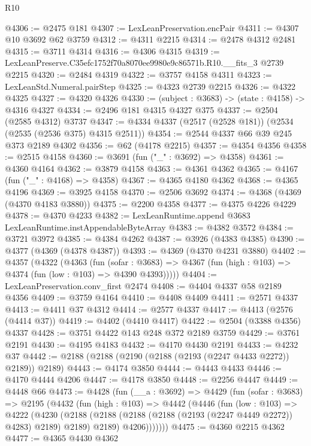\begin{lexlean}{R10}
\begin{coremodule}
@4306 := @2475 @181
@4307 := LexLeanPreservation.encPair
@4311 := @4307 @10 @3692 @62 @3759
@4312 := @4311 @2215
@4314 := @2478 @4312 @2481
@4315 := @3711 @4314
@4316 := @4306 @4315
@4319 := LexLeanPreserve.C35efc1752f70a8070ee9980e9c86571b.R10.__fits_3 @2739 @2215
@4320 := @2484 @4319
@4322 := @3757 @4158 @4311
@4323 := LexLeanStd.Numeral.pairStep
@4325 := @4323 @2739 @2215
@4326 := @4322 @4325
@4327 := @4320 @4326
@4330 := (subject : @3683) -> (state : @4158) -> @4316 @4327
@4334 := @2496 @181 @4315 @4327 @375
@4337 := @2504 (@2585 @4312) @3737
@4347 := @4334 @4337 (@2517 (@2528 @181)) (@2534 (@2535 (@2536 @375) @4315 @2511))
@4354 := @2544 @4337 @66 @39 @245 @373 @2189 @4302
@4356 := @62 (@4178 @2215)
@4357 := @4354 @4356
@4358 := @2515 @4158
@4360 := @3691 (fun ("_" : @3692) => @4358)
@4361 := @4360 @4164
@4362 := @3879 @4158
@4363 := @4361 @4362
@4365 := @4167 (fun ("_" : @4168) => @4358)
@4367 := @4365 @4180 @4362
@4368 := @4365 @4196
@4369 := @3925 @4158
@4370 := @2506 @3692
@4374 := @4368 (@4369 (@4370 @4183 @3880))
@4375 := @2200 @4358
@4377 := @4375 @4226 @4229
@4378 := @4370 @4233
@4382 := LexLeanRuntime.append @3683 LexLeanRuntime.instAppendableByteArray
@4383 := @4382 @3572
@4384 := @3721 @3972
@4385 := @4384 @4262
@4387 := @3926 (@4383 @4385)
@4390 := @4377 (@4369 (@4378 @4387))
@4393 := @4369 (@4370 @4231 @3880)
@4402 := @4357
    (@4322
      (@4363
        (fun (sofar : @3683) =>
        @4367 (fun (high : @103) => @4374 (fun (low : @103) => @4390 @4393)))))
@4404 := LexLeanPreservation.conv_first @2474
@4408 := @4404 @4337 @58 @2189 @4356
@4409 := @3759 @4164
@4410 := @4408 @4409
@4411 := @2571 @4337
@4413 := @4411 @37 @4312
@4414 := @2577 @4337
@4417 := @4413 (@2576 (@4414 @37))
@4419 := @4402 (@4410 @4417)
@4422 := @2504 (@3388 @4356) @4337
@4428 := @3751 @4422 @143 @248 @372 @2189 @3759
@4429 := @3761 @2191
@4430 := @4195 @4183
@4432 := @4170 @4430 @2191
@4433 := @4232 @37
@4442 := @2188 (@2188 (@2190 (@2188 (@2193 (@2247 @4433 @2272)) @2189)) @2189)
@4443 := @4174 @3850
@4444 := @4443 @4433
@4446 := @4170 @4444 @4206
@4447 := @4178 @3850
@4448 := @2256 @4447
@4449 := @4448 @66
@4473 := @4428
    (fun (__a : @3692) =>
    @4429
      (fun (sofar : @3683) =>
      @2195
        (@4432
          (fun (high : @103) =>
          @4442
            (@4446
              (fun (low : @103) =>
              @4222
                (@4230
                  (@2188
                    (@2188 (@2188 (@2188 (@2193 (@2247 @4449 @2272)) @4283) @2189) @2189)
                    @2189)
                  @4206)))))))
@4475 := @4360 @2215 @4362
@4477 := @4365 @4430 @4362

\end{coremodule}
\end{lexlean}
